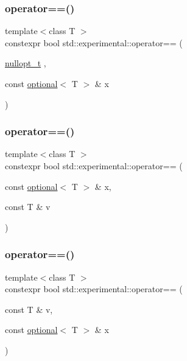 \subsubsection{\texorpdfstring{operator==()}{operator==()}\hspace{0.1cm}{\footnotesize\ttfamily [3/9]}}
{\footnotesize\ttfamily template$<$class T $>$ \\
constexpr bool std\+::experimental\+::operator== (\begin{DoxyParamCaption}\item[{\mbox{\hyperlink{structstd_1_1experimental_1_1nullopt__t}{nullopt\+\_\+t}}}]{,  }\item[{const \mbox{\hyperlink{classstd_1_1experimental_1_1optional}{optional}}$<$ T $>$ \&}]{x }\end{DoxyParamCaption})\hspace{0.3cm}{\ttfamily [noexcept]}}

\mbox{\label{namespacestd_1_1experimental_ad40f3ff2c6562139fe910ab3d0a63f10}} 
\subsubsection{\texorpdfstring{operator==()}{operator==()}\hspace{0.1cm}{\footnotesize\ttfamily [4/9]}}
{\footnotesize\ttfamily template$<$class T $>$ \\
constexpr bool std\+::experimental\+::operator== (\begin{DoxyParamCaption}\item[{const \mbox{\hyperlink{classstd_1_1experimental_1_1optional}{optional}}$<$ T $>$ \&}]{x,  }\item[{const T \&}]{v }\end{DoxyParamCaption})}

\mbox{\label{namespacestd_1_1experimental_a1958e649d145d612bc04a821d28c0ffb}} 
\subsubsection{\texorpdfstring{operator==()}{operator==()}\hspace{0.1cm}{\footnotesize\ttfamily [5/9]}}
{\footnotesize\ttfamily template$<$class T $>$ \\
constexpr bool std\+::experimental\+::operator== (\begin{DoxyParamCaption}\item[{const T \&}]{v,  }\item[{const \mbox{\hyperlink{classstd_1_1experimental_1_1optional}{optional}}$<$ T $>$ \&}]{x }\end{DoxyParamCaption})}

